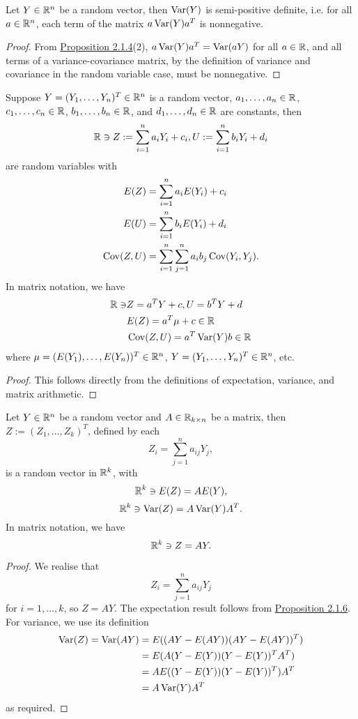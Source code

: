 \documentclass[11pt,fleqn]{book} %
\begin{document}
\begin{corollary} \label{cor:215}
Let \(Y \in \mathbb{R}^n\) be a random vector, then \(\operatorname{Var}(Y)\) is semi-positive definite, i.e. for all \(a \in \mathbb{R}^n\), each term of the matrix \(a\operatorname{Var}(Y)a^T\) is nonnegative.
\end{corollary}
\begin{proof} From \hyperref[prop:214]{Proposition 2.1.4}(2), \(a\operatorname{Var}(Y)a^T = \operatorname{Var}(aY)\) for all \(a \in \mathbb{R}\), and all terms of a variance-covariance matrix, by the definition of variance and covariance in the random variable case, must be nonnegative.
\end{proof}

\begin{proposition} \label{prop:216}
Suppose \(Y = (Y_1, \ldots, Y_n)^T \in \mathbb{R}^n\) is a random vector, \(a_1, \ldots, a_n \in \mathbb{R}\), \(c_1, \ldots, c_n \in \mathbb{R}\), \(b_1, \ldots, b_n \in \mathbb{R}\), and \(d_1, \ldots, d_n \in \mathbb{R}\) are constants, then
\[
\mathbb{R} \ni Z := \sum_{i=1}^n a_iY_i + c_i, U := \sum_{i=1}^nb_iY_i + d_i
\]
are random variables with
\[
\begin{aligned}
E(Z) &= \sum_{i=1}^na_iE(Y_i) + c_i \\
E(U) &= \sum_{i=1}^nb_iE(Y_i) + d_i \\
\operatorname{Cov}(Z, U) &= \sum_{i=1}^n\sum_{j=1}^n a_ib_j\operatorname{Cov}(Y_i, Y_j).
\end{aligned}
\]
\indent In matrix notation, we have
\[
\begin{aligned}
\mathbb{R} \ni &Z = a^TY + c, U = b^TY + d \\
&E(Z) = a^T\mu + c \in \mathbb{R} \\
&\operatorname{Cov}(Z, U) = a^T\operatorname{Var}(Y)b \in \mathbb{R}
\end{aligned}
\]
where \(\mu = (E(Y_1), \ldots, E(Y_n))^T \in \mathbb{R}^n\), \(Y = (Y_1, \ldots, Y_n)^T \in \mathbb{R}^n\), etc.
\end{proposition}
\begin{proof} This follows directly from the definitions of expectation, variance, and matrix arithmetic.\end{proof}

\begin{proposition} \label{prop:217}
Let \(Y \in \mathbb{R}^n\) be a random vector and \(A \in \mathbb{R}_{k\times n}\) be a matrix, then \(Z := (Z_1, \ldots, Z_k)^T\), defined by each 
\[
Z_i = \sum_{j=1}^n a_{ij}Y_j,
\]
is a random vector in \(\mathbb{R}^k\), with
\[
\mathbb{R}^k \ni E(Z) = AE(Y),
\]
\[
\mathbb{R}^k \ni \operatorname{Var}(Z) = A\operatorname{Var}(Y)A^T.
\]
\indent In matrix notation, we have
\[
\mathbb{R}^k \ni Z = AY.
\]
\end{proposition}
\begin{proof} We realise that
\[
Z_i = \sum_{j=1}^n a_{ij}Y_j
\]
for \(i = 1, \ldots, k\), so \(Z = AY\). The expectation result follows from \hyperref[prop:216]{Proposition 2.1.6}. For variance, we use its definition
\[
\begin{aligned}
\operatorname{Var}(Z) = \operatorname{Var}(AY) &= E((AY - E(AY))(AY - E(AY))^T) \\
&= E(A(Y - E(Y))(Y - E(Y))^TA^T) \\
&= AE((Y - E(Y))(Y - E(Y))^T) A^T \\
&= A\operatorname{Var}(Y)A^T
\end{aligned}
\]
as required.
\end{proof}
\end{document}
